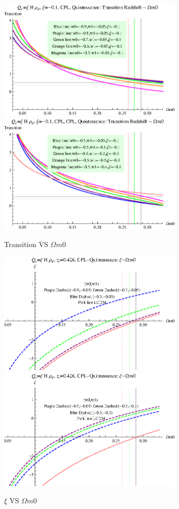 \documentclass[12pt,a4paper]{article}
\begin{document}
\begin{figure}
\centering
\includegraphics[width=250pt]{rhod_I2CCPL_Quint_TransVSOmegam01.eps}
\includegraphics[width=250pt]{rhod_I2CCPL_Quint_TransVSOmegam02.eps}
\caption{Transition VS $\Omega m0$}\label{fig-rhod_I2CCPL_Quint_TransVSOmegam0}
\end{figure}



\begin{figure}
\centering
\includegraphics[width=250pt]{rhod_I2CCPL_Quint_xiVSOmegam01.eps}
\includegraphics[width=250pt]{rhod_I2CCPL_Quint_xiVSOmegam02.eps}
\caption{$\xi$ VS $\Omega m0$}\label{fig-rhod_I2CCPL_Quint_xiVSOmegam0}
\end{figure}
\end{document}
